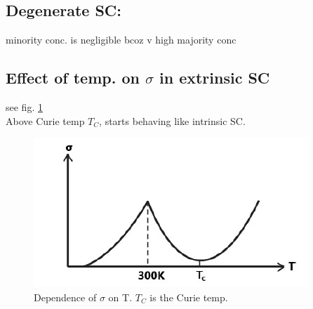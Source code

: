 \documentclass[10pt, a4paper]{report}
\begin{document}
	\subsection{Degenerate SC:} minority conc. is negligible bcoz v high majority conc\\
	
	\subsection{Effect of temp. on $ \sigma $ in extrinsic SC}
	see fig. \ref{fig:effect-of-temp}\\
	Above Curie temp $ T_C $, starts behaving like intrinsic SC.
	\begin{figure}[h]
		\centering
		\includegraphics[width=0.7\linewidth]{img/effect-of-temp}
		\caption{Dependence of $ \sigma $ on T. $ T_C $ is the Curie temp.}
		\label{fig:effect-of-temp}
	\end{figure}
	
\end{document}
